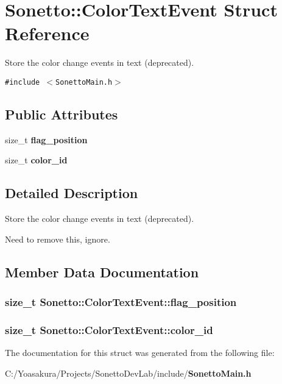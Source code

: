 \section{Sonetto::ColorTextEvent Struct Reference}
\label{struct_sonetto_1_1_color_text_event}
Store the color change events in text (deprecated).  


{\tt \#include $<$SonettoMain.h$>$}

\subsection*{Public Attributes}
\begin{CompactItemize}
\item 
size\_\-t {\bf flag\_\-position}
\item 
size\_\-t {\bf color\_\-id}
\end{CompactItemize}


\subsection{Detailed Description}
Store the color change events in text (deprecated). 

Need to remove this, ignore. 

\subsection{Member Data Documentation}
\subsubsection{\setlength{\rightskip}{0pt plus 5cm}size\_\-t {\bf Sonetto::ColorTextEvent::flag\_\-position}}\label{struct_sonetto_1_1_color_text_event_533ce39810989f9e4824f0d359e39d1a}


\subsubsection{\setlength{\rightskip}{0pt plus 5cm}size\_\-t {\bf Sonetto::ColorTextEvent::color\_\-id}}\label{struct_sonetto_1_1_color_text_event_8af5ce4e6f1c817a159eaf750d2f3b1a}




The documentation for this struct was generated from the following file:\begin{CompactItemize}
\item 
C:/Yoasakura/Projects/SonettoDevLab/include/{\bf SonettoMain.h}\end{CompactItemize}

